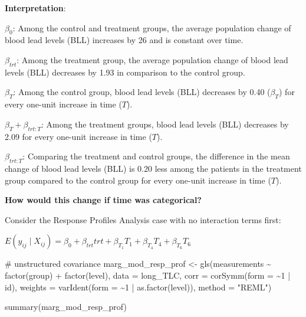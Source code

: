 \documentclass[
  letterpaper,
  DIV=11,
  numbers=noendperiod]{scrreprt}
\newenvironment{Shaded}{\begin{snugshade}}{\end{snugshade}}
\newcommand{\AttributeTok}[1]{\textcolor[rgb]{0.40,0.45,0.13}{#1}}
\newcommand{\CommentTok}[1]{\textcolor[rgb]{0.37,0.37,0.37}{#1}}
\newcommand{\DecValTok}[1]{\textcolor[rgb]{0.68,0.00,0.00}{#1}}
\newcommand{\FunctionTok}[1]{\textcolor[rgb]{0.28,0.35,0.67}{#1}}
\newcommand{\NormalTok}[1]{\textcolor[rgb]{0.00,0.23,0.31}{#1}}
\newcommand{\OtherTok}[1]{\textcolor[rgb]{0.00,0.23,0.31}{#1}}
\newcommand{\SpecialCharTok}[1]{\textcolor[rgb]{0.37,0.37,0.37}{#1}}
\newcommand{\StringTok}[1]{\textcolor[rgb]{0.13,0.47,0.30}{#1}}
\begin{document}
\textbf{Interpretation}:

\(\beta_{0}\): Among the control and treatment groups, the average
population change of blood lead levels (BLL) increases by 26 and is
constant over time.

\(\beta_{trt}\): Among the treatment group, the average population
change of blood lead levels (BLL) decreases by 1.93 in comparison to the
control group.

\(\beta_{T}\): Among the control group, blood lead levels (BLL)
decreases by 0.40 (\(\beta_{T}\)) for every one-unit increase in time
(\(T\)).

\(\beta_{T} + \beta_{trt:T}\): Among the treatment groups, blood lead
levels (BLL) decreases by 2.09 for every one-unit increase in time
(\(T\)).

\(\beta_{trt:T}\): Comparing the treatment and control groups, the
difference in the mean change of blood lead levels (BLL) is 0.20 less
among the patients in the treatment group compared to the control group
for every one-unit increase in time (\(T\)).

\textbf{How would this change if time was categorical?}

Consider the Response Profiles Analysis case with no interaction terms
first:

\begin{center}
$E(y_{ij} \mid X_{ij}) = \beta_0 +  \beta_{trt}trt +  \beta_{T_1}T_1 +  \beta_{T_4}T_4 +  \beta_{T_6}T_6$
\end{center}

\begin{Shaded}
\begin{Highlighting}[]
\CommentTok{\# unstructured covariance}
\NormalTok{marg\_mod\_resp\_prof }\OtherTok{\textless{}{-}} \FunctionTok{gls}\NormalTok{(measurements }\SpecialCharTok{\textasciitilde{}} \FunctionTok{factor}\NormalTok{(group) }\SpecialCharTok{+} \FunctionTok{factor}\NormalTok{(level), }\AttributeTok{data =}\NormalTok{ long\_TLC,}
    \AttributeTok{corr =} \FunctionTok{corSymm}\NormalTok{(}\AttributeTok{form =} \SpecialCharTok{\textasciitilde{}}\DecValTok{1} \SpecialCharTok{|}\NormalTok{ id), }\AttributeTok{weights =} \FunctionTok{varIdent}\NormalTok{(}\AttributeTok{form =} \SpecialCharTok{\textasciitilde{}}\DecValTok{1} \SpecialCharTok{|} \FunctionTok{as.factor}\NormalTok{(level)),}
    \AttributeTok{method =} \StringTok{"REML"}\NormalTok{)}

\FunctionTok{summary}\NormalTok{(marg\_mod\_resp\_prof)}
\end{Highlighting}
\end{Shaded}
\end{document}
